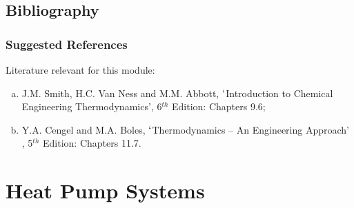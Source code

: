 \documentclass[10pt,compress]{beamer}
\begin{document}
\subsection{Bibliography} 
\begin{frame}
 \frametitle{Suggested References}
  Literature relevant for this module:
  \begin{enumerate}[(a)]
   \item J.M. Smith, H.C. Van Ness and M.M. Abbott, $\lq$Introduction to Chemical Engineering Thermodynamics', 6$^{th}$ Edition: Chapters 9.6;
   \item Y.A. Cengel and M.A. Boles, $\lq$Thermodynamics -- An Engineering Approach' , 5$^{th}$ Edition: Chapters 11.7.
  \end{enumerate}
\end{frame}

\section{Heat Pump Systems}
\end{document}
